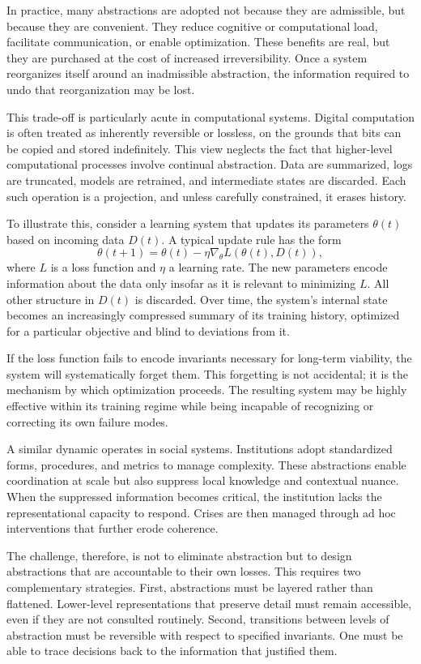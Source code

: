 \documentclass[12pt,oneside]{book}
\begin{document}
In practice, many abstractions are adopted not because they are admissible, but because they are convenient. They reduce cognitive or computational load, facilitate communication, or enable optimization. These benefits are real, but they are purchased at the cost of increased irreversibility. Once a system reorganizes itself around an inadmissible abstraction, the information required to undo that reorganization may be lost.

This trade-off is particularly acute in computational systems. Digital computation is often treated as inherently reversible or lossless, on the grounds that bits can be copied and stored indefinitely. This view neglects the fact that higher-level computational processes involve continual abstraction. Data are summarized, logs are truncated, models are retrained, and intermediate states are discarded. Each such operation is a projection, and unless carefully constrained, it erases history.

To illustrate this, consider a learning system that updates its parameters \(\theta(t)\) based on incoming data \(D(t)\). A typical update rule has the form
\[
\theta(t+1) = \theta(t) - \eta \nabla_\theta L(\theta(t), D(t)),
\]
where \(L\) is a loss function and \(\eta\) a learning rate. The new parameters encode information about the data only insofar as it is relevant to minimizing \(L\). All other structure in \(D(t)\) is discarded. Over time, the system's internal state becomes an increasingly compressed summary of its training history, optimized for a particular objective and blind to deviations from it.

If the loss function fails to encode invariants necessary for long-term viability, the system will systematically forget them. This forgetting is not accidental; it is the mechanism by which optimization proceeds. The resulting system may be highly effective within its training regime while being incapable of recognizing or correcting its own failure modes.

A similar dynamic operates in social systems. Institutions adopt standardized forms, procedures, and metrics to manage complexity. These abstractions enable coordination at scale but also suppress local knowledge and contextual nuance. When the suppressed information becomes critical, the institution lacks the representational capacity to respond. Crises are then managed through ad hoc interventions that further erode coherence.

The challenge, therefore, is not to eliminate abstraction but to design abstractions that are accountable to their own losses. This requires two complementary strategies. First, abstractions must be layered rather than flattened. Lower-level representations that preserve detail must remain accessible, even if they are not consulted routinely. Second, transitions between levels of abstraction must be reversible with respect to specified invariants. One must be able to trace decisions back to the information that justified them.
\end{document}
